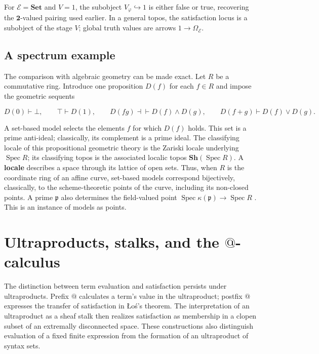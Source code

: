 \documentclass[11pt]{article}
\makeatletter
\newcommand{\atsign}{\mathord{@}}
\theoremstyle{definition}
\makeatother
\begin{document}
For \(\mathcal E=\mathbf{Set}\) and \(V=1\), the subobject
\(V_\varphi\hookrightarrow1\) is either false or true, recovering the
\(\mathbf2\)-valued pairing used earlier. In a general topos, the satisfaction
locus is a subobject of the stage \(V\); global truth values are arrows
\(1\to\Omega_{\mathcal E}\).

\subsection{A spectrum example}

The comparison with algebraic geometry can be made exact. Let \(R\) be a
commutative ring. Introduce one proposition \(D(f)\) for each \(f\in R\) and
impose the geometric sequents \cite{Manuell2022}

\[
D(0)\vdash\bot,\qquad
\top\vdash D(1),\qquad
D(fg)\dashv\vdash D(f)\wedge D(g),\qquad
D(f+g)\vdash D(f)\vee D(g).
\]

A set-based model selects the elements \(f\) for which \(D(f)\) holds. This
set is a prime anti-ideal; classically, its complement is a prime ideal. The
classifying locale of this propositional geometric theory is the Zariski locale
underlying \(\operatorname{Spec}R\); its classifying topos is the associated
localic topos \(\mathbf{Sh}(\operatorname{Spec}R)\). A \textbf{locale} describes a
space through its lattice of open sets. Thus, when
\(R\) is the coordinate
ring of an affine curve, set-based models correspond bijectively, classically,
to the scheme-theoretic points of the curve, including its non-closed points. A prime
\(\mathfrak p\) also determines the field-valued point
\(\operatorname{Spec}\kappa(\mathfrak p)\to\operatorname{Spec}R\)
\cite{StacksPoints}. This is an instance of models as points.

\section{Ultraproducts, stalks, and the
\texorpdfstring{\(\atsign\)}{@}-calculus}
\label{ultraproducts-at-calculus}

The distinction between term evaluation and satisfaction persists under
ultraproducts. Prefix \(\atsign\) calculates a term's value in the ultraproduct;
postfix \(\atsign\) expresses the transfer of satisfaction in
\L{}o\'s's theorem. The interpretation of an ultraproduct as a sheaf stalk
then realizes satisfaction as membership in a clopen subset of an
extremally disconnected space. These constructions also distinguish
evaluation of a fixed finite expression from the formation of an
ultraproduct of syntax sets.
\end{document}
